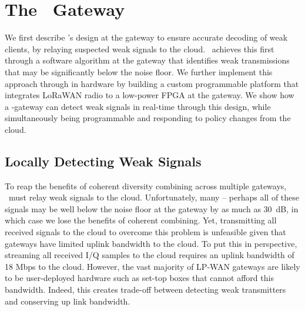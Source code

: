 \section{The \name\ Gateway}
\label{sec:gateway}



We first describe \name's design at the gateway to ensure accurate decoding of weak clients, by relaying suspected weak signals to the cloud. \name\ achieves this first through a software algorithm at the gateway that identifies weak transmissions that may be significantly below the noise floor. We further implement this approach through in hardware by building a custom programmable platform that integrates LoRaWAN radio to a low-power FPGA at the gateway. We show how a \name-gateway can detect weak signals in real-time through this design, while simultaneously being programmable and responding to policy changes from the cloud. 

\subsection{Locally Detecting Weak Signals}
\label{sec:local-detection}
To reap the benefits of coherent diversity combining across multiple gateways, \name\ must relay weak signals to the cloud. Unfortunately, many -- perhaps all of these signals may be well below the noise floor at the gateway by as much as 30~dB, in which case we lose the benefits of coherent combining. Yet, transmitting all received signals to the cloud to overcome this problem is unfeasible given that gateways have limited uplink bandwidth to the cloud. To put this in perspective, streaming all received I/Q samples to the cloud requires an uplink bandwidth of 18 Mbps to the cloud. However, the vast majority of LP-WAN gateways are likely to be user-deployed hardware such as set-top boxes that cannot afford this bandwidth. Indeed, this creates  trade-off between detecting weak transmitters and conserving up link bandwidth.

